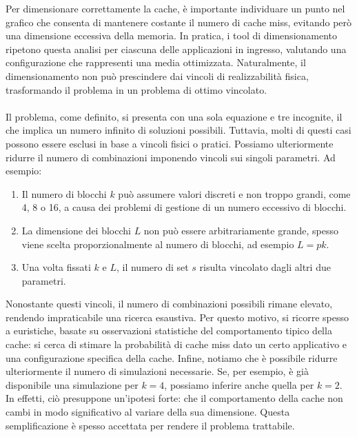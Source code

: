 Per dimensionare correttamente la cache, è importante individuare un punto nel grafico che consenta di mantenere costante il numero di cache miss, evitando però una dimensione eccessiva della memoria. In pratica, i tool di dimensionamento ripetono questa analisi per ciascuna delle applicazioni in ingresso, valutando una configurazione che rappresenti una media ottimizzata. Naturalmente, il dimensionamento non può prescindere dai vincoli di realizzabilità fisica, trasformando il problema in un problema di ottimo vincolato.
\\
\\
Il problema, come definito, si presenta con una sola equazione e tre incognite, il che implica un numero infinito di soluzioni possibili. Tuttavia, molti di questi casi possono essere esclusi in base a vincoli fisici o pratici. Possiamo ulteriormente ridurre il numero di combinazioni imponendo vincoli sui singoli parametri. Ad esempio:
\begin{enumerate}
    \item Il numero di blocchi \(k\) può assumere valori discreti e non troppo grandi, come 4, 8 o 16, a causa dei problemi di gestione di un numero eccessivo di blocchi.
    \item La dimensione dei blocchi \(L\) non può essere arbitrariamente grande, spesso viene scelta proporzionalmente al numero di blocchi, ad esempio \(L=pk\).
    \item Una volta fissati \(k\) e \(L\), il numero di set \(s\) risulta vincolato dagli altri due parametri.
\end{enumerate}

Nonostante questi vincoli, il numero di combinazioni possibili rimane elevato, rendendo impraticabile una ricerca esaustiva. Per questo motivo, si ricorre spesso a euristiche, basate su osservazioni statistiche del comportamento tipico della cache: si cerca di stimare la probabilità di cache miss dato un certo applicativo e una configurazione specifica della cache. Infine, notiamo che è possibile ridurre ulteriormente il numero di simulazioni necessarie. Se, per esempio, è già disponibile una simulazione per \(k=4\), possiamo inferire anche quella per \( k=2\). In effetti, ciò presuppone un'ipotesi forte: che il comportamento della cache non cambi in modo significativo al variare della sua dimensione. Questa semplificazione è spesso accettata per rendere il problema trattabile.